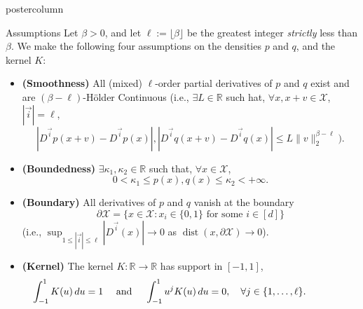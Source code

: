 \documentclass[final,hyperref={pdfpagelabels=false}]{beamer}
\newcommand{\R}{\mathbb{R}}
\newcommand{\X}{\mathcal{X}}
\newcommand{\dist}{\operatorname{dist}}
\newcommand{\vi}{{\vec i}}
\begin{document}
\begin{frame}
\begin{columns}
\begin{column}{.32\textwidth}
\begin{beamercolorbox}[center,wd=\textwidth]{postercolumn}
\begin{minipage}[T]{.95\textwidth}
{%
            \vfill
            \begin{block}{Assumptions}
              {\footnotesize
              Let $\beta > 0$, and let $\ell := \lfloor \beta \rfloor$ be
              the greatest integer \emph{strictly} less than $\beta$. We make
              the following four assumptions on the densities $p$ and $q$, and
              the kernel $K$:\\}
              \begin{itemize}
              \item {\bf\footnotesize (Smoothness)} All (mixed)
              $\ell$-order partial derivatives of $p$ and $q$ exist and are
              $(\beta - \ell)$-H\"older Continuous (i.e., $\exists L \in \R$
              such hat, $\forall x, x + v \in \X$, $|\vi| = \ell$,
                    \[|D^\vi p(x + v) - D^\vi p(x)|,
                      |D^\vi q(x + v) - D^\vi q(x)|
                                        \leq L\|v\|_2^{\beta - \ell}\mbox{)}.\]
              \item {\bf\footnotesize (Boundedness)}
                    $\exists \kappa_1,\kappa_2 \in \R$ such that,
                    $\forall x \in \X$,
                    \[0 < \kappa_1 \leq p(x),q(x) \leq \kappa_2 < +\infty.\]
              \item {\bf\footnotesize (Boundary)} All derivatives of
                    $p$ and $q$ vanish at the boundary
                    \[\partial\X = \{x \in \X : x_i \in \{0,1\}
                                            \mbox{ for some } i \in [d]\}\]
                    (i.e., $\sup_{1 \leq |\vi| \leq \ell} |D^\vi(x)| \to 0$
                    as $\dist(x,\partial\X) \to 0$).
                    \vspace{1cm}
              \item {\bf\footnotesize (Kernel)} The kernel
                    $K : \R \to \R$ has support in $[-1,1]$,
                    \[\hspace{-15mm}\int_{-1}^1 K(u) \, du = 1
                                    \quad \mbox{ and } \quad
                                    \int_{-1}^1 u^j K(u) \, du = 0,
                                    \quad
                                    \forall j \in \{1,\dots,\ell\}.\]
              \end{itemize}
            \end{block}
            \vfill
          }
        \end{minipage}
      \end{beamercolorbox}
    \end{column}


\end{columns}
\end{frame}
\end{document}
